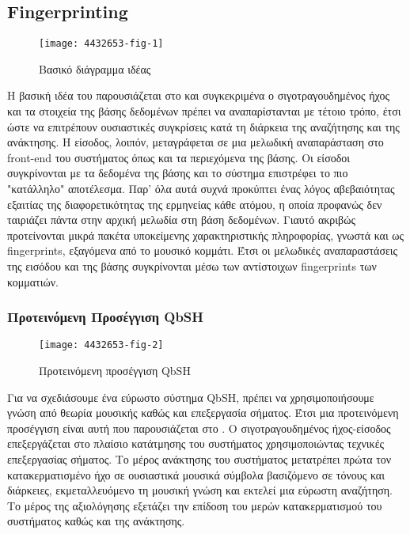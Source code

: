 \newcommand*{\fp}{Fingerprinting}%
\newcommand*{\fps}{fingerprints}%
\subsection{\fp{}}\label{sub:fingerprinting}


\begin{wrapfigure}{r}{0.5\textwidth}
        \centering
        \vspace{-20pt}\texttt{[image: 4432653-fig-1]}
        \vspace{-20pt}\caption{Βασικό διάγραμμα ιδέας}
        \label{fig:4432653-fig-1}
\end{wrapfigure}
Η βασική ιδέα του \cite{fingerapproach2008} παρουσιάζεται στο 
και συγκεκριμένα ο σιγοτραγουδημένος ήχος και τα στοιχεία της βάσης δεδομένων
πρέπει να αναπαρίστανται με τέτοιο τρόπο, έτσι ώστε να επιτρέπουν ουσιαστικές
συγκρίσεις κατά τη διάρκεια της αναζήτησης και της ανάκτησης. Η είσοδος, λοιπόν,
μεταγράφεται σε μια μελωδική αναπαράσταση στο front-end του συστήματος όπως και
τα περιεχόμενα της βάσης. Οι είσοδοι συγκρίνονται με τα δεδομένα της βάσης και
το σύστημα επιστρέφει το πιο "κατάλληλο" αποτέλεσμα. Παρ' όλα αυτά συχνά
προκύπτει ένας λόγος αβεβαιότητας εξαιτίας της διαφορετικότητας της ερμηνείας
κάθε ατόμου, η οποία προφανώς δεν ταιριάζει πάντα στην αρχική μελωδία στη βάση
δεδομένων. Γιαυτό ακριβώς προτείνονται μικρά πακέτα υποκείμενης χαρακτηριστικής
πληροφορίας, γνωστά και ως \fps{}, εξαγόμενα από το μουσικό κομμάτι. Έτσι οι
μελωδικές αναπαραστάσεις της εισόδου και της βάσης συγκρίνονται μέσω των
αντίστοιχων \fps{} των κομματιών.

\subsubsection{Προτεινόμενη Προσέγγιση QbSH}
\begin{wrapfigure}{r}{0.5\textwidth}
        \centering
        \vspace{-20pt}\texttt{[image: 4432653-fig-2]}
        \vspace{-20pt}\caption{Προτεινόμενη προσέγγιση QbSH}
        \label{fig:4432653-fig-2}
\end{wrapfigure}
Για να σχεδιάσουμε ένα εύρωστο σύστημα QbSH, πρέπει να χρησιμοποιήσουμε γνώση
από θεωρία μουσικής καθώς και επεξεργασία σήματος. Έτσι μια προτεινόμενη
προσέγγιση είναι αυτή που παρουσιάζεται στο . Ο
σιγοτραγουδημένος ήχος-είσοδος επεξεργάζεται στο πλαίσιο κατάτμησης του
συστήματος χρησιμοποιώντας τεχνικές επεξεργασίας σήματος. Το μέρος ανάκτησης
του συστήματος μετατρέπει πρώτα τον κατακερματισμένο ήχο σε ουσιαστικά μουσικά
σύμβολα βασιζόμενο σε τόνους και διάρκειες, εκμεταλλευόμενο τη μουσική γνώση
και εκτελεί μια εύρωστη αναζήτηση. Το μέρος της αξιολόγησης εξετάζει την
επίδοση του μερών κατακερματισμού του συστήματος καθώς και της ανάκτησης.

